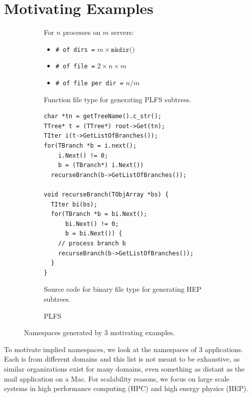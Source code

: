 \section{Motivating Examples}


\begin{figure}[t]
  \centering
  \begin{subfigure}[b]{.3\linewidth}
      \centering
For \(n\) processes on \(m\) servers:

\begin{itemize}
  \item[] \texttt{\# of dirs =} \(m \times \texttt{mkdir()}\)
  \item[] \texttt{\# of file =} \(2 \times n \times m\)
  \item[] \texttt{\# of file per dir =} \(n/m\)
\end{itemize}
      \caption{Function file type for generating PLFS subtrees.} \label{fig:plfs}
  \end{subfigure}
  \begin{subfigure}[b]{.3\linewidth}
      \centering
      \footnotesize
      \begin{verbatim}
char *tn = getTreeName().c_str();
TTree* t = (TTree*) root->Get(tn);
TIter i(t->GetListOfBranches());
for(TBranch *b = i.next();
    i.Next() != 0;
    b = (TBranch*) i.Next())
  recurseBranch(b->GetListOfBranches());

void recurseBranch(TObjArray *bs) {
  TIter bi(bs); 
  for(TBranch *b = bi.Next();
      bi.Next() != 0;
      b = bi.Next()) {
    // process branch b 
    recurseBranch(b->GetListOfBranches());
  }
} 
      \end{verbatim}
      \caption{Source code for binary file type for generating HEP subtrees.} \label{fig:plfs}
  \end{subfigure}
  \begin{subfigure}[b]{.3\linewidth}
      \centering
      \caption{PLFS} \label{fig:plfs}
  \end{subfigure}
\caption{Namespaces generated by 3 motivating examples.\label{fig:use-cases}}
\end{figure}

To motivate implied namespaces, we look at the namespaces of 3 applications.
Each is from different domains and this list is not meant to be exhaustive, as
similar organizations exist for many domains, even something as distant as the
mail application on a Mac. For scalability reasons, we focus on large scale
systems in high performance computing (HPC) and high energy physics (HEP).

